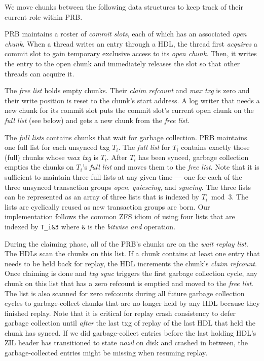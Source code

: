 \documentclass[12pt,a4paper,twoside]{book}
\begin{document}
{We move chunks between the following data structures to keep track of their current role within PRB.
\begin{description}[noitemsep]
    \item[Commit Slots]
    PRB maintains a roster of \textit{commit slots}, each of which has an associated \textit{open chunk}.
    When a thread writes an entry through a HDL, the thread first \textit{acquires} a commit slot to gain temporary exclusive access to its \textit{open chunk}.
    Then, it writes the entry to the open chunk and immediately releases the slot so that other threads can acquire it.
    \item[Free List]
    The \textit{free list} holds empty chunks.
    Their \textit{claim refcount} and \textit{max txg} is zero and their write position is reset to the chunk's start address.
    A log writer that needs a new chunk for its commit slot puts the commit slot's current open chunk on the \textit{full list} (see below) and gets a new chunk from the \textit{free list}.
    \item[Full Lists]
    The \textit{full lists} contains chunks that wait for garbage collection.
    PRB maintains one full list for each unsynced txg $T_i$. The \textit{full list} for $T_i$ contains exactly those (full) chunks whose \textit{max txg} is $T_i$.
    After $T_i$ has been synced, garbage collection empties the chunks on $T_i$'s \textit{full list} and moves them to the \textit{free list}.
    Note that it is sufficient to maintain three full lists at any given time --- one for each of the three unsynced transaction groups \textit{open}, \textit{quiescing}, and \textit{syncing}.
    The three lists can be represented as an array of three lists that is indexed by $T_i \bmod 3$.
    The lists are cyclically reused as new transaction groups are born.
    Our implementation follows the common ZFS idiom of using four lists that are indexed by \lstinline{T_i&3} where \lstinline{&} is the \textit{bitwise and} operation.
    \item[Wait Replay List]
    During the claiming phase, all of the PRB's chunks are on the \textit{wait replay list}.
    The HDLs scan the chunks on this list.
    If a chunk contains at least one entry that needs to be held back for replay, the HDL increments the chunk's \textit{claim refcount}.
    Once claiming is done and \textit{txg sync} triggers the first garbage collection cycle, any chunk on this list that has a zero refcount is emptied and moved to the \textit{free list}.
    The list is also scanned for zero refcounts during all future garbage collection cycles to garbage-collect chunks that are no longer held by any HDL because they finished replay.
    Note that it is critical for replay crash consistency to defer garbage collection until \textit{after} the last txg of replay of the last HDL that held the chunk has synced.
    If we did garbage-collect entries before the last holding HDL's ZIL header has transitioned to state \textit{nozil} on disk and crashed in between, the garbage-collected entries might be missing when resuming replay.
\end{description}

}
\end{document}
